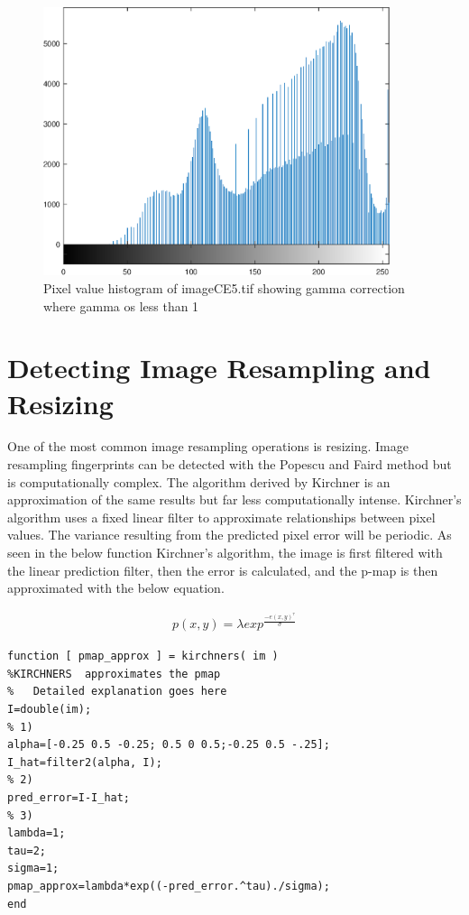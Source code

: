 \documentclass{article}
\begin{document}
\begin{figure}[H]
\centering
\includegraphics [width=4in]{lab6_06.eps}
\caption{Pixel value histogram of imageCE5.tif showing gamma correction
where gamma os less than 1}
\end{figure}


\section{Detecting Image Resampling and Resizing}

\qquad One of the most common image resampling operations is resizing. Image
resampling fingerprints can be detected with the Popescu and Faird method
but is computationally complex. The algorithm derived by Kirchner is an
approximation of the same results but far less computationally intense. 
Kirchner's algorithm uses a fixed linear filter to approximate relationships
between pixel values. The variance resulting from the predicted pixel error
will be periodic. As seen in the below function Kirchner's algorithm, the
image is first filtered with the linear prediction filter, then the error is
calculated, and the p-map is then approximated with the below equation. 
 
\begin{align} 
	p(x,y)=\lambda exp^{\frac{-e(x,y)^\tau}{\sigma}}
\end{align}



\color{lightgray} \begin{verbatim}
function [ pmap_approx ] = kirchners( im )
%KIRCHNERS  approximates the pmap 
%   Detailed explanation goes here
I=double(im); 
% 1)
alpha=[-0.25 0.5 -0.25; 0.5 0 0.5;-0.25 0.5 -.25]; 
I_hat=filter2(alpha, I); 
% 2)
pred_error=I-I_hat; 
% 3)
lambda=1; 
tau=2; 
sigma=1; 
pmap_approx=lambda*exp((-pred_error.^tau)./sigma); 
end
\end{verbatim} 
\end{document}
